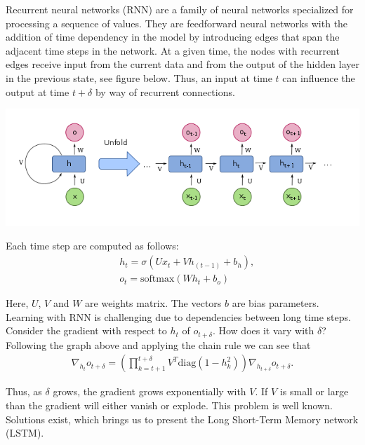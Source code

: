 \documentclass[landscape,a0paper,fontscale=0.285]{baposter} %
\begin{document}
\begin{poster}
{\begin{multicols}{2}
Recurrent neural networks (RNN) are a family of neural networks specialized for
processing a sequence of values. They are feedforward neural networks with the
addition of time dependency in the model by introducing edges that span the
adjacent time steps in the network. At a given time, the nodes with recurrent
edges receive input from the current data and from the output of the hidden
layer in the previous state, see figure below. Thus, an input at time $t$ can
influence the output at time $t + \delta$ by way of recurrent connections.

\begin{center}
    \includegraphics[width = 0.9\linewidth]{RNN.png}
\end{center}

Each time step are computed as follows:
\begin{align*}
    &h_t = \sigma(U x_t + V h_{(t-1)} + b_h)\text{,}\\
    &o_t = \text{softmax}(W h_t + b_o)
\end{align*}

Here, $ U$, $V$ and $W$ are weights matrix. The vectors $b$ are bias
parameters. Learning with RNN is challenging due to dependencies between long
time steps. Consider the gradient with respect to $h_t$ of $o_{t + \delta}$.
How does it vary with $\delta$? Following the graph above and applying the
chain rule we can see that
\begin{align*}
    \nabla_{h_t}o_{t + \delta} =
    \left( \prod_{k = t+1}^{t+\delta} V^T \text{diag}(1 - h^2_k) \right)
    \nabla_{h_{t + \delta}}o_{t + \delta}.
\end{align*}

Thus, as $\delta$ grows, the gradient grows exponentially with $V$. If $V$ is
small or large than the gradient will either vanish or explode. This problem is
well known. Solutions exist, which brings us to present the Long Short-Term
Memory network (LSTM).

\end{multicols}
}%


\end{poster}
\end{document}
